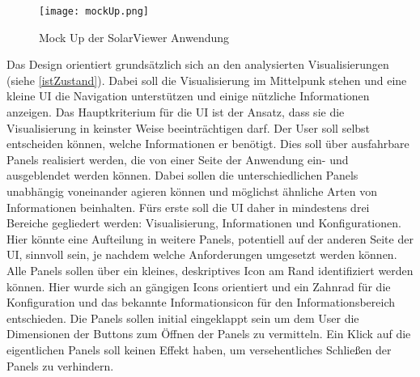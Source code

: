 \begin{figure}[H]
  \texttt{[image: mockUp.png]}
  \caption{Mock Up der SolarViewer Anwendung}
  \label{mockUp}
\end{figure}

Das Design orientiert grundsätzlich sich an den analysierten Visualisierungen (siehe \ref{istZustand}). Dabei soll die Visualisierung im Mittelpunk stehen und eine kleine UI die Navigation unterstützen und einige nützliche Informationen anzeigen. Das Hauptkriterium für die UI ist der Ansatz, dass sie die Visualisierung in keinster Weise beeinträchtigen darf. Der User soll selbst entscheiden können, welche Informationen er benötigt. Dies soll über ausfahrbare Panels realisiert werden, die von einer Seite der Anwendung ein- und ausgeblendet werden können. Dabei sollen die unterschiedlichen Panels unabhängig voneinander agieren können und möglichst ähnliche Arten von Informationen beinhalten. Fürs erste soll die UI daher in mindestens drei Bereiche gegliedert werden: Visualisierung, Informationen und Konfigurationen. Hier könnte eine Aufteilung in weitere Panels, potentiell auf der anderen Seite der UI, sinnvoll sein, je nachdem welche Anforderungen umgesetzt werden können. Alle Panels sollen über ein kleines, deskriptives Icon am Rand identifiziert werden können. Hier wurde sich an gängigen Icons orientiert und ein Zahnrad für die Konfiguration und das bekannte Informationsicon für den Informationsbereich entschieden. Die Panels sollen initial eingeklappt sein um dem User die Dimensionen der Buttons zum Öffnen der Panels zu vermitteln. Ein Klick auf die eigentlichen Panels soll keinen Effekt haben, um versehentliches Schließen der Panels zu verhindern.

